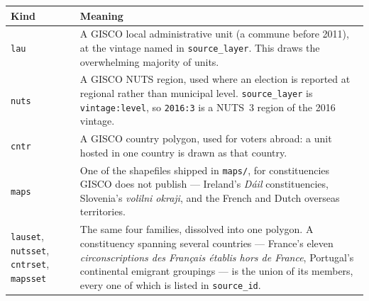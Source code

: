 \begin{longtable}{p{2.4cm}p{12.6cm}}
\toprule
\textbf{Kind} & \textbf{Meaning} \\
\midrule
\endhead
\texttt{lau}     & A GISCO local administrative unit (a commune before 2011),
                   at the vintage named in \texttt{source\_layer}.  This draws
                   the overwhelming majority of units. \\
\texttt{nuts}    & A GISCO NUTS region, used where an election is reported at
                   regional rather than municipal level.
                   \texttt{source\_layer} is \texttt{vintage:level}, so
                   \texttt{2016:3} is a NUTS~3 region of the 2016 vintage. \\
\texttt{cntr}    & A GISCO country polygon, used for voters abroad: a unit
                   hosted in one country is drawn as that country. \\
\texttt{maps}    & One of the shapefiles shipped in \texttt{maps/}, for
                   constituencies GISCO does not publish — Ireland's
                   \emph{Dáil} constituencies, Slovenia's
                   \emph{volilni okraji}, and the French and Dutch overseas
                   territories. \\
\texttt{lauset}, \texttt{nutsset}, \texttt{cntrset}, \texttt{mapsset}
                 & The same four families, dissolved into one polygon.  A
                   constituency spanning several countries — France's eleven
                   \emph{circonscriptions des Français établis hors de France},
                   Portugal's continental emigrant groupings — is the union of
                   its members, every one of which is listed in
                   \texttt{source\_id}. \\
\bottomrule
\end{longtable}

